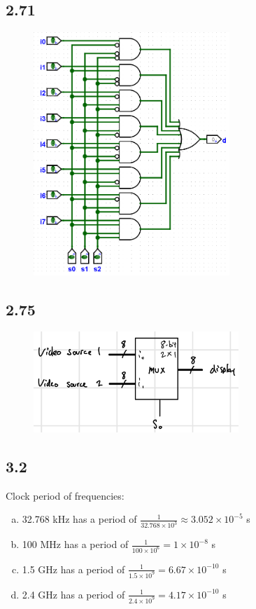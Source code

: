 \documentclass{article}
\begin{document}
\newpage
\subsection*{2.71}
\begin{figure}[h]
    \centering
    \includegraphics[width=0.66\textwidth]{./images/2_71.png}
\end{figure}

\subsection*{2.75}
\begin{figure}[h]
    \centering
    \includegraphics[width=0.69\textwidth]{./images/2_75.jpg}
\end{figure}

\newpage
\subsection*{3.2}
Clock period of frequencies:
\begin{enumerate}[(a)]
    \item 32.768 kHz has a period of $\frac{1}{32.768 \times 10^3} \approx 3.052 \times 10^{-5}$ s
    \item 100 MHz has a period of $\frac{1}{100 \times 10^6} = 1 \times 10^{-8}$ s
    \item 1.5 GHz has a period of $\frac{1}{1.5 \times 10^9} = 6.67 \times 10^{-10}$ s
    \item 2.4 GHz has a period of $\frac{1}{2.4 \times 10^9} = 4.17 \times 10^{-10}$ s
\end{enumerate}
\end{document}

